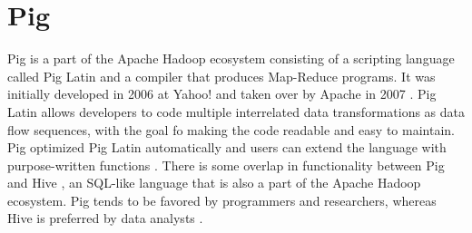 \section{Pig}

Pig is a part of the Apache Hadoop
ecosystem consisting of a scripting language called Pig
Latin and a compiler that produces Map-Reduce
programs. It was initially developed in 2006 at
Yahoo! and taken over by Apache in 2007
\cite{hid-sp18-419-die2015datascience}. Pig Latin allows developers to
code multiple interrelated data transformations as data flow
sequences, with the goal fo making the code readable and easy to
maintain. Pig optimized Pig Latin automatically and users can extend
the language with purpose-written functions
\cite{hid-sp18-419-www-pig}. There is some overlap in functionality
between Pig and Hive , an SQL-like  language
that is also a part of the Apache Hadoop ecosystem. Pig tends to be
favored by programmers and researchers, whereas Hive is preferred by
data analysts \cite{hid-sp18-419-www-dezyre-pig}.
